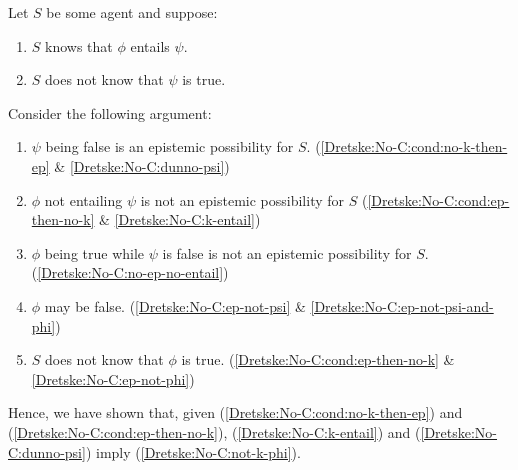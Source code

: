 \begin{note}
  Let \(S\) be some agent and suppose:
  \begin{enumerate}[label=\arabic*., ref=\arabic*]
  \item
    \label{Dretske:No-C:k-entail}
    \(S\) knows that \(\phi\) entails \(\psi\).
  \item
    \label{Dretske:No-C:dunno-psi}
    \(S\) does not know that \(\psi\) is true.
  \end{enumerate}
  Consider the following argument:
  \begin{enumerate}[label=\arabic*., ref=\arabic*,resume]
  \item
    \label{Dretske:No-C:ep-not-psi}
    \(\psi\) being false is an epistemic possibility for \(S\).%
    \hfill (\ref{Dretske:No-C:cond:no-k-then-ep} \& \ref{Dretske:No-C:dunno-psi})
  \item
    \label{Dretske:No-C:no-ep-no-entail}
    \(\phi\) not entailing \(\psi\) is not an epistemic possibility for \(S\)%
    \hfill (\ref{Dretske:No-C:cond:ep-then-no-k} \& \ref{Dretske:No-C:k-entail})
  \item
    \label{Dretske:No-C:ep-not-psi-and-phi}
    \(\phi\) being true while \(\psi\) is false is not an epistemic possibility for \(S\).%
    \hfill (\ref{Dretske:No-C:no-ep-no-entail})
  \item
    \label{Dretske:No-C:ep-not-phi}
    \(\phi\) may be false.%
    \hfill (\ref{Dretske:No-C:ep-not-psi} \& \ref{Dretske:No-C:ep-not-psi-and-phi})
  \item
    \label{Dretske:No-C:not-k-phi}
    \(S\) does not know that \(\phi\) is true.%
    \hfill (\ref{Dretske:No-C:cond:ep-then-no-k} \& \ref{Dretske:No-C:ep-not-phi})
  \end{enumerate}

  Hence, we have shown that, given (\ref{Dretske:No-C:cond:no-k-then-ep}) and (\ref{Dretske:No-C:cond:ep-then-no-k}), (\ref{Dretske:No-C:k-entail}) and (\ref{Dretske:No-C:dunno-psi}) imply (\ref{Dretske:No-C:not-k-phi}).


\end{note}
